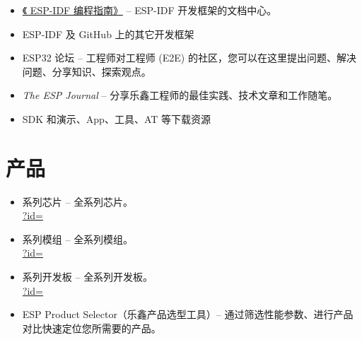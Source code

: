 {\begin{minipage}{\textwidth}
\begin{itemize}
  \ifcsname linkidfprogguideCN\endcsname%
    \item \href{\linkprefix\linkidfprogguideCN}{《\chipseries{} ESP-IDF 编程指南》} --
        {\small ESP-IDF 开发框架的文档中心。}
  \fi%

    \item ESP-IDF 及 GitHub 上的其它开发框架\\
        \href{\linkprefix\linkgithub}{\linkprefix\linkgithub}

    \item ESP32 论坛 --
        {\small 工程师对工程师 (E2E) 的社区，您可以在这里提出问题、解决问题、分享知识、探索观点。}\\
        \href{\linkprefix\linkespforum}{\linkprefix\linkespforum}
        
    \item \textit{The ESP Journal} --
        {\small 分享乐鑫工程师的最佳实践、技术文章和工作随笔。}\\
        \href{\linkprefix\linkespjournal}{\linkprefix\linkespjournal}

    \item SDK 和演示、App、工具、AT 等下载资源\\
        \href{\linkprefix\linksdkdemoCN}{\linkprefix\linksdkdemoCN}
\end{itemize}

\end{minipage}



\begin{minipage}{\textwidth}

\section*{产品}

\begin{itemize}
    \item \chipseries{} 系列芯片 --
        {\small \chipseries{} 全系列芯片。}\\
        \href{\linkprefix\linkespsocsCN?id=\chipseries}{\linkprefix\linkespsocsCN?id=\chipseries}
    \item \chipseries{} 系列模组 --
        {\small \chipseries{} 全系列模组。}\\
        \href{\linkprefix\linkespmodulesCN?id=\chipseries}{\linkprefix\linkespmodulesCN?id=\chipseries}
    \item \chipseries{} 系列开发板 --
        {\small \chipseries{} 全系列开发板。}\\
        \href{\linkprefix\linkespdevkitsCN?id=\chipseries}{\linkprefix\linkespdevkitsCN?id=\chipseries}
    \item ESP Product Selector（乐鑫产品选型工具）--
        {\small 通过筛选性能参数、进行产品对比快速定位您所需要的产品。}\\
        \href{\linkprefix\linkespproductselectorCN}{\linkprefix\linkespproductselectorCN}
\end{itemize}


\end{minipage}}
